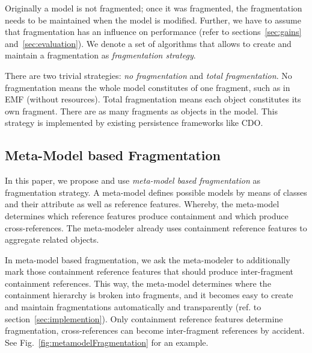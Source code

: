Originally a model is not fragmented; once it was fragmented, the fragmentation needs to be maintained when the model is modified. Further, we have to assume that fragmentation has an influence on performance (refer to sections~\ref{sec:gains} and~\ref{sec:evaluation}). We denote a set of algorithms that allows to create and maintain a fragmentation as \emph{fragmentation strategy}.

There are two trivial strategies: \emph{no fragmentation} and \emph{total fragmentation}. No fragmentation means the whole model constitutes of one fragment, such as in EMF (without resources). Total fragmentation means each object constitutes its own fragment. There are as many fragments as objects in the model. This strategy is implemented by existing persistence frameworks like CDO.

\subsection{Meta-Model based Fragmentation}

In this paper, we propose and use \emph{meta-model based fragmentation} as fragmentation strategy. A meta-model defines possible models by means of classes and their attribute as well as reference features. Whereby, the meta-model determines which reference features produce containment and which produce cross-references. The meta-modeler already uses containment reference features to aggregate related objects.

In meta-model based fragmentation, we ask the meta-modeler to additionally mark those containment reference features that should produce inter-fragment containment references. 
This way, the meta-model determines where the containment hierarchy is broken into fragments, and it becomes easy to create and maintain fragmentations automatically and transparently (ref. to section~\ref{sec:implemention}). Only containment reference features determine fragmentation, cross-references can become inter-fragment references by accident. See Fig.~\ref{fig:metamodelFragmentation} for an example.



